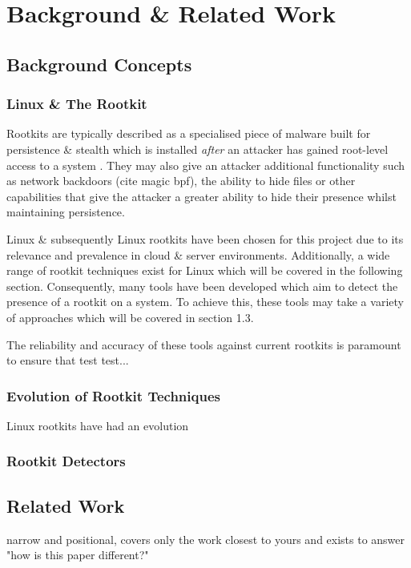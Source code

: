 
\chapter{Background \& Related Work}

\section{Background Concepts}
\subsection{Linux \& The Rootkit}

Rootkits are typically described as a specialised piece of malware built for persistence \& stealth which is installed \textit{after} an attacker has gained root-level access to a system \citep{rootkitNist}.
They may also give an attacker additional functionality such as network backdoors (cite magic bpf), the ability to hide files or other capabilities that give the attacker a greater ability to hide their presence whilst maintaining persistence.

Linux \& subsequently Linux rootkits have been chosen for this project due to its relevance and prevalence in cloud \& server environments. Additionally, a wide range of rootkit techniques exist for Linux which will be covered in the following section.
Consequently, many tools have been developed which aim to detect the presence of a rootkit on a system. To achieve this, these tools may take a variety of approaches which will be covered in section 1.3.

The reliability and accuracy of these tools against current rootkits is paramount to ensure that test test...

\subsection{Evolution of Rootkit Techniques}

Linux rootkits have had an evolution

\subsection{Rootkit Detectors}



\section{Related Work}

narrow and positional, covers only the work closest to yours and exists to answer "how is this paper different?"
